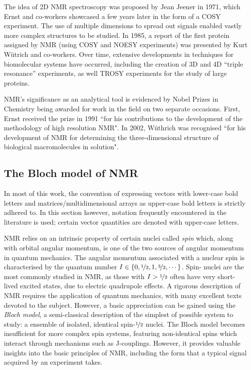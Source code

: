 The idea of 2D NMR spectroscopy was proposed by Jean Jeener in
1971\cite{Jeener1971, Jeener2016}, which Ernst and co-workers showcased a few
years later in the form of a \acs{COSY} experiment\cite{Aue1976a}. The use of
multiple dimensions to spread out signals enabled vastly more complex
structures to be studied. In 1985, a report of the first protein assigned by
\ac{NMR} (using \acs{COSY} and \acs{NOESY} experiments) was presented by Kurt
W\"utrich and co-workers\cite{Williamson1985}. Over time, extensive
developments in techniques for biomolecular systems have occurred, including
the creation of 3D and 4D ``triple resonance'' experiments\cite{Marion1989,
Kay1990}, as well \acs{TROSY} experiments\cite{Pervushin1997} for the study of
large proteins.

\ac{NMR}'s significance as an analytical tool is evidenced by Nobel Prizes in
Chemistry being awarded for work in the field on two separate occasions. First,
Ernst received the prize in 1991 ``for his contributions to the development of
the methodology of high resolution \acl{NMR}"\cite{Ernst1992}. In 2002,
W\"uthrich was recognised ``for his development of \acl{NMR} for determining
the three-dimensional structure of biological macromolecules in
solution"\cite{Wuthrich2003}.

\subsection{The Bloch model of \acs{NMR}}
\begin{remark}
    In most of this work, the convention of expressing vectors with lower-case
    bold letters and matrices/multidimensional arrays as upper-case bold
    letters is strictly adhered to. In this section however, notation
    frequently encountered in the literature is used; certain vector
    quantities are denoted with upper-case letters.
\end{remark}

\ac{NMR} relies on an intrinsic property of certain nuclei called \textit{spin}
which, along with orbital angular momentum, is one of the two sources of
angular momentum in quantum mechanics.
The angular momentum associated with a nuclear spin is characterised by the
quantum number $I \in \lbrace 0, \nicefrac{1}{2}, 1, \nicefrac{3}{2}, \cdots
\rbrace$. Spin-
nuclei are the most commonly studied in \ac{NMR}, as those with $I >
\nicefrac{1}{2}$ often have very short-lived excited states, due to electric
quadrupole effects. A rigorous description of \ac{NMR} requires the application
of quantum mechanics, with many excellent texts devoted to the
subject\cite{Abragam1961,Goldman1988,Cavanagh2007}. However, a basic
appreciation can be gained using the \emph{Bloch model}, a semi-classical description
of the simplest of possible system to study: a ensemble of isolated, identical
spin-$\nicefrac{1}{2}$ nuclei\cite[Chapter 1]{Hore2015}.
The Bloch model becomes insufficient for more complex spin systems, featuring
non-identical spins which interact through mechanisms such as J-couplings.
However, it provides valuable insights into the basic principles of \ac{NMR},
including the form that a typical signal acquired by an experiment takes.

